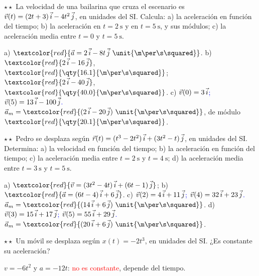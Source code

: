 \begin{exercise}
    \(\star\star\) La velocidad de una bailarina que cruza el escenario es \(\vec v(t) = (2t + 3)\,\vec{i} - 4t^2\,\vec{j}\), en
    unidades del SI. Calcula: a) la aceleración en función del tiempo; b) la aceleración en \(t = \qty{2}{\s}\) y en
    \(t = \qty{5}{\s}\), y sus módulos; c) la aceleración media entre \(t = 0\) y \(t = \qty{5}{\s}\).
    \begin{solu}
        a) \(\textcolor{red}{\vec a = 2\,\ivec - 8t\,\jvec~\unit{\m\per\s\squared}}\). b) \(\textcolor{red}{2\,\ivec - 16\,\jvec}\),
        \(\textcolor{red}{\qty{16.1}{\m\per\s\squared}}\); \(\textcolor{red}{2\,\ivec - 40\,\jvec}\), \(\textcolor{red}{\qty{40.0}{\m\per\s\squared}}\).
        c) \textcolor{blue}{\(\vec v(0) = 3\,\vec{i}\); \(\vec v(5) = 13\,\vec{i} - 100\,\vec{j}\).} \(\vec a_m = \textcolor{red}{(2\,\ivec - 20\,\jvec)~\unit{\m\per\s\squared}}\),
        de módulo \(\textcolor{red}{\qty{20.1}{\m\per\s\squared}}\).
    \end{solu}
\end{exercise}

\begin{exercise}
    \(\star\star\) Pedro se desplaza según \(\vec r(t) = (t^3 - 2t^2)\,\vec{i} + (3t^2 - t)\,\vec{j}\), en unidades del SI. Determina:
    a) la velocidad en función del tiempo; b) la aceleración en función del tiempo; c) la aceleración media entre \(t = \qty{2}{\s}\)
    y \(t = \qty{4}{\s}\); d) la aceleración media entre \(t = \qty{3}{\s}\) y \(t = \qty{5}{\s}\).
    \begin{solu}
        a) \(\textcolor{red}{\vec v = (3t^2 - 4t)\,\ivec + (6t - 1)\,\jvec}\); b) \(\textcolor{red}{\vec a = (6t - 4)\,\ivec + 6\,\jvec}\).
        c) \textcolor{blue}{\(\vec v(2) = 4\,\vec{i} + 11\,\vec{j}\); \(\vec v(4) = 32\,\vec{i} + 23\,\vec{j}\).}
        \(\vec a_m = \textcolor{red}{(14\,\ivec + 6\,\jvec)~\unit{\m\per\s\squared}}\).
        d) \textcolor{blue}{\(\vec v(3) = 15\,\vec{i} + 17\,\vec{j}\); \(\vec v(5) = 55\,\vec{i} + 29\,\vec{j}\).}
        \(\vec a_m = \textcolor{red}{(20\,\ivec + 6\,\jvec)~\unit{\m\per\s\squared}}\).
    \end{solu}
\end{exercise}

\begin{exercise}
    \(\star\star\) Un móvil se desplaza según \(x(t) = -2t^3\), en unidades del SI. ¿Es constante su aceleración?
    \begin{solu}
        \(v = -6t^2\) y \(a = -12t\): \textcolor{red}{no es constante}, depende del tiempo.
    \end{solu}
\end{exercise}

